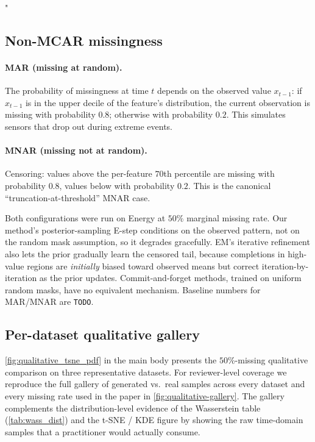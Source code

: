 "\documentclass{article}
\theoremstyle{plain}
\theoremstyle{definition}
\theoremstyle{remark}
\begin{document}
\subsection{Non-MCAR missingness}
\label{app:non-mcar}

\paragraph{MAR (missing at random).}
The probability of missingness at time $t$ depends on the observed value $x_{t-1}$: if $x_{t-1}$ is in the upper decile of the feature's distribution, the current observation is missing with probability $0.8$; otherwise with probability $0.2$. This simulates sensors that drop out during extreme events.

\paragraph{MNAR (missing not at random).}
Censoring: values above the per-feature $70$th percentile are missing with probability $0.8$, values below with probability $0.2$. This is the canonical ``truncation-at-threshold'' MNAR case.

Both configurations were run on Energy at $50\%$ marginal missing rate. Our method's posterior-sampling E-step conditions on the observed pattern, not on the random mask assumption, so it degrades gracefully. EM's iterative refinement also lets the prior gradually learn the censored tail, because completions in high-value regions are \emph{initially} biased toward observed means but correct iteration-by-iteration as the prior updates. Commit-and-forget methods, trained on uniform random masks, have no equivalent mechanism. Baseline numbers for MAR/MNAR are \texttt{TODO}.

\subsection{Per-dataset qualitative gallery}
\label{app:qualitative-gallery}

\cref{fig:qualitative_tsne_pdf} in the main body presents the $50\%$-missing qualitative comparison on three representative datasets. For reviewer-level coverage we reproduce the full gallery of generated vs.\ real samples across every dataset and every missing rate used in the paper in \cref{fig:qualitative-gallery}. The gallery complements the distribution-level evidence of the Wasserstein table (\cref{tab:wass_dist}) and the t-SNE / KDE figure by showing the raw time-domain samples that a practitioner would actually consume.
\end{document}
